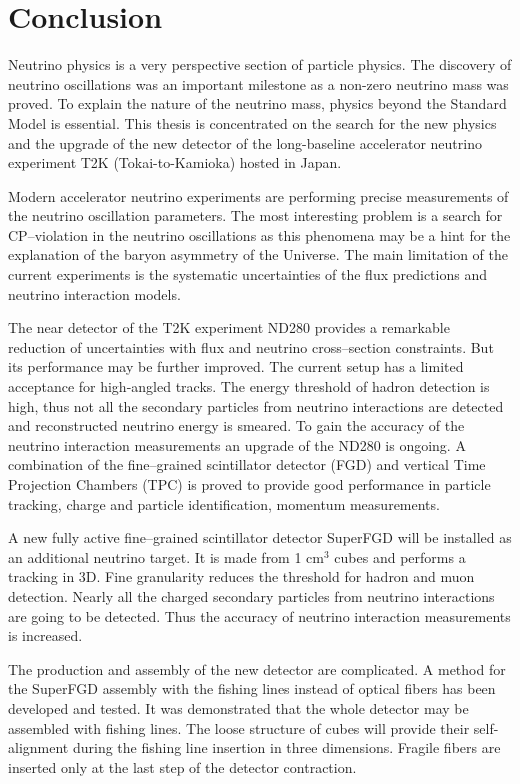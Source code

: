 \documentclass[./main.tex]{subfiles}
\begin{document}
\chapter*{Conclusion}

Neutrino physics is a very perspective section of particle physics. The discovery of neutrino oscillations was an important milestone as a non-zero neutrino mass was proved. To explain the nature of the neutrino mass, physics beyond the Standard Model is essential. This thesis is concentrated on the search for the new physics and the upgrade of the new detector of the long-baseline accelerator neutrino experiment T2K (Tokai-to-Kamioka) hosted in Japan.

Modern accelerator neutrino experiments are performing precise measurements of the neutrino oscillation parameters. The most interesting problem is a search for CP--violation in the neutrino oscillations as this phenomena may be a hint for the explanation of the baryon asymmetry of the Universe. The main limitation of the current experiments is the systematic uncertainties of the flux predictions and neutrino interaction models.

The near detector of the T2K experiment ND280 provides a remarkable reduction of uncertainties with flux and neutrino cross--section constraints. But its performance may be further improved. The current setup has a limited acceptance for high-angled tracks. The energy threshold of hadron detection is high, thus not all the secondary particles from neutrino interactions are detected and reconstructed neutrino energy is smeared. To gain the accuracy of the neutrino interaction measurements an upgrade of the ND280 is ongoing. A combination of the fine--grained scintillator detector (FGD) and vertical Time Projection Chambers (TPC) is proved to provide good performance in particle tracking, charge and particle identification, momentum measurements.

A new fully active fine--grained scintillator detector SuperFGD will be installed as an additional neutrino target. It is made from 1 cm${}^3$ cubes and performs a tracking in 3D. Fine granularity reduces the threshold for hadron and muon detection. Nearly all the charged secondary particles from neutrino interactions are going to be detected. Thus the accuracy of neutrino interaction measurements is increased.

The production and assembly of the new detector are complicated. A method for the SuperFGD assembly with the fishing lines instead of optical fibers has been developed and tested. It was demonstrated that the whole detector may be assembled with fishing lines. The loose structure of cubes will provide their self-alignment during the fishing line insertion in three dimensions. Fragile fibers are inserted only at the last step of the detector contraction.
\end{document}
